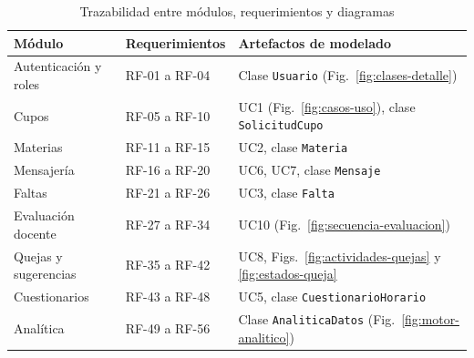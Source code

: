 \begin{table}[H]
\centering
\caption{Trazabilidad entre módulos, requerimientos y diagramas}
\label{tab:trazabilidad-completa}
\small
\begin{tabularx}{\textwidth}{@{}l l X@{}}
\toprule
\rowcolor{azulClaro}
\textbf{Módulo} & \textbf{Requerimientos} & \textbf{Artefactos de modelado} \\
\midrule
Autenticación y roles & RF-01 a RF-04 & Clase \texttt{Usuario} (Fig.~\ref{fig:clases-detalle}) \\
Cupos & RF-05 a RF-10 & UC1 (Fig.~\ref{fig:casos-uso}), clase \texttt{SolicitudCupo} \\
Materias & RF-11 a RF-15 & UC2, clase \texttt{Materia} \\
Mensajería & RF-16 a RF-20 & UC6, UC7, clase \texttt{Mensaje} \\
Faltas & RF-21 a RF-26 & UC3, clase \texttt{Falta} \\
Evaluación docente & RF-27 a RF-34 & UC10 (Fig.~\ref{fig:secuencia-evaluacion}) \\
Quejas y sugerencias & RF-35 a RF-42 & UC8, Figs.~\ref{fig:actividades-quejas} y \ref{fig:estados-queja} \\
Cuestionarios & RF-43 a RF-48 & UC5, clase \texttt{CuestionarioHorario} \\
Analítica & RF-49 a RF-56 & Clase \texttt{AnaliticaDatos} (Fig.~\ref{fig:motor-analitico}) \\
\bottomrule
\end{tabularx}
\end{table}